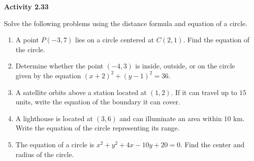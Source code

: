 \vspace{0.3ex}
\noindent\textbf{Activity 2.33}

\vspace{0.2ex}

Solve the following problems using the distance formula and equation of a circle.

\begin{enumerate}
    \item A point $P(-3,7)$ lies on a circle centered at $C(2,1)$. Find the equation of the circle.
    \item Determine whether the point $(-4,3)$ is inside, outside, or on the circle given by the equation $(x + 2)^2 + (y - 1)^2 = 36$.
    \item A satellite orbits above a station located at $(1,2)$. If it can travel up to $15$ units, write the equation of the boundary it can cover.
    \item A lighthouse is located at $(3,6)$ and can illuminate an area within $10$ km. Write the equation of the circle representing its range.
    \item The equation of a circle is $x^2 + y^2 + 4x - 10y + 20 = 0$. Find the center and radius of the circle.
\end{enumerate}
